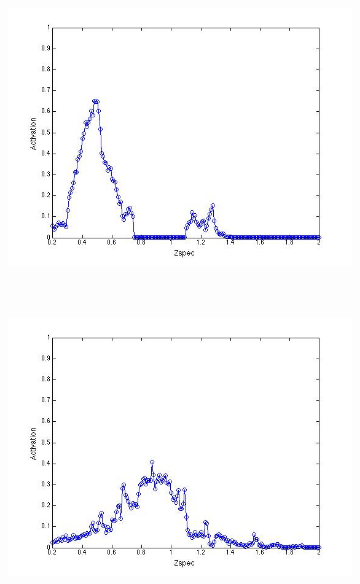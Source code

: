 \documentclass[useAMS,usenatbib,fleqn]{mn2e}
\begin{document}
\begin{figure}
\begin{subfigure}[b]{0.075\textwidth}
                \includegraphics[trim = 35px 15px 50px 25px, clip=true,width=\textwidth]{figures/activation_07.jpg}
        \end{subfigure}
        ~
        \begin{subfigure}[b]{0.075\textwidth}
                \includegraphics[trim = 35px 15px 50px 25px, clip=true,width=\textwidth]{figures/activation_08.jpg}
        \end{subfigure}
        ~
        \begin{subfigure}[b]{0.075\textwidth}

\end{subfigure}
\end{figure}
\end{document}
